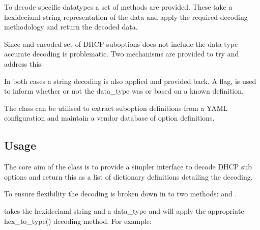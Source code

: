 \documentclass[letterpaper,10pt,english]{sphinxmanual}
\begin{document}
\sphinxAtStartPar
To decode specific data\sphinxhyphen{}types a set of  methods are provided.
These take a hexideciaml string representation of the data and apply the
required decoding methodology and return the decoded data.

\sphinxAtStartPar
Since and encoded set of DHCP sub\sphinxhyphen{}options does not include the data type
accurate decoding is problematic. Two mechanisms are provided to try and
address this:

\begin{sphinxVerbatim}[commandchars=\\\{\}]
            
    

           
\end{sphinxVerbatim}

\sphinxAtStartPar
In both cases a string decoding is also applied and provided back. A flag,
 is used to inform whether or not the data\_type was  or
based on a known definition.

\sphinxAtStartPar
The  class can be utilised to extract sub\sphinxhyphen{}option
definitions from a YAML configuration and maintain a vendor database of
option definitions.


\subsection{Usage}
\label{\detokenize{dhcp_decode-usage:usage}}
\sphinxAtStartPar
The core aim of the class is to provide a simpler interface to decode DHCP sub
options and return this as a list of dictionary definitions detailing the
decoding.

\sphinxAtStartPar
To ensure flexibility the decoding is broken down in to two methods:
 and .

\sphinxAtStartPar
{} takes the hexideciaml string and a data\_type and will
apply the appropriate hex\_to\_type() decoding method. For example:
\end{document}
